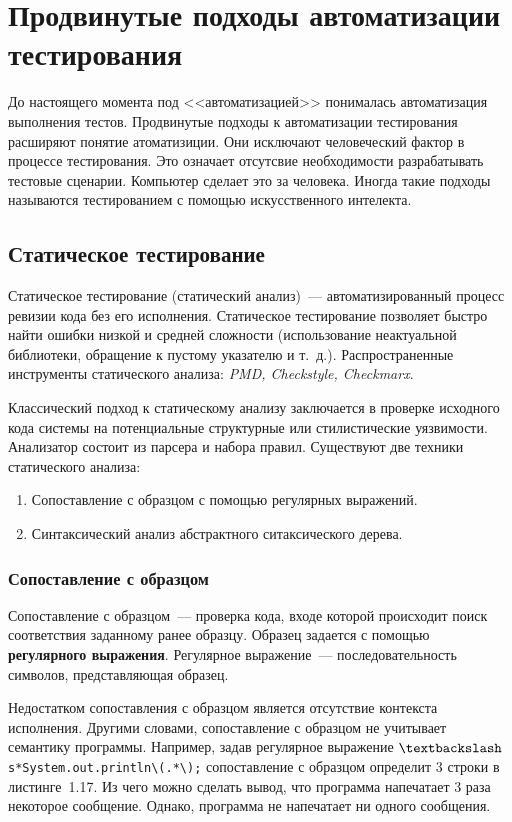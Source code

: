 \section{Продвинутые подходы автоматизации тестирования} 

До настоящего момента под <<автоматизацией>> понималась автоматизация выполнения тестов. Продвинутые подходы к автоматизации тестирования расширяют понятие атоматизиции. Они исключают человеческий фактор в процессе тестирования. Это означает отсутсвие необходимости разрабатывать тестовые сценарии. Компьютер сделает это за человека. Иногда такие подходы называются тестированием с помощью искусственного интелекта.

\subsection{Статическое тестирование} 

Статическое тестирование (статический анализ)~--- автоматизированный процесс ревизии кода без его исполнения. Статическое тестирование позволяет быстро найти ошибки низкой и средней сложности (использование неактуальной библиотеки, обращение к пустому указателю и т.~д.). Распространенные инструменты статического анализа: \textit{PMD, Checkstyle, Checkmarx}.

Классический подход к статическому анализу заключается в проверке исходного кода системы на потенциальные структурные или стилистические уязвимости. Анализатор состоит из парсера и набора правил. Существуют две техники статического анализа:


\begin{enumerate}
	\item Сопоставление с образцом с помощью регулярных выражений.
	\item Синтаксический анализ абстрактного ситаксического дерева.
\end{enumerate}


\subsubsection{Сопоставление с образцом}

Сопоставление с образцом~--- проверка кода, входе которой происходит поиск соответствия заданному ранее образцу. Образец задается с помощью \textbf{регулярного выражения}. Регулярное выражение~--- последовательность символов, представляющая образец.

Недостатком сопоставления с образцом является отсутствие контекста исполнения. Другими словами, сопоставление с образцом не учитывает семантику программы. Например, задав регулярное выражение \texttt{$\textbackslash$s*System.out.println\textbackslash(.*\textbackslash);} сопоставление с образцом определит 3 строки в листинге~1.17. Из чего можно сделать вывод, что программа напечатает 3 раза некоторое сообщение. Однако, программа не напечатает ни одного сообщения. 


